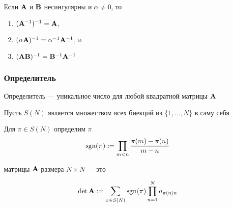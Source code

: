 \begin{frame}

    \vspace{.7em}
    \Fact{\eqref{ET-fa:bpiv}}
    Если $\mathbf A$ и $\mathbf B$ несингулярны и $\alpha \not= 0$, то
    \begin{enumerate}
        \item $(\mathbf A^{-1})^{-1} = \mathbf A$,
        \item $(\alpha \mathbf A)^{-1} = \alpha^{-1} \mathbf A^{-1}$, и 
        \item $(\mathbf A \mathbf B)^{-1} = \mathbf B^{-1} \mathbf A^{-1}$
    \end{enumerate}
    
\end{frame}

\begin{frame}\frametitle{Определитель}

    \vspace{.7em}
    Определитель --- уникальное число для любой квадратной матрицы $\mathbf A$
    
    Пусть $S(N)$ является множеством
    всех биекций из $\{1, \ldots, N\}$ в саму себя
    
    \vspace{.7em}
    Для $\pi \in S(N)$ определим  $\pi$ 
    \begin{equation*}
        \operatorname{sgn}(\pi) := \prod_{m < n} \frac{\pi(m) - \pi(n)}{m - n}
    \end{equation*}
    
    \vspace{1em}
     матрицы $\mathbf A$ размера $N \times N$ --- это
    
    \begin{equation*}
        \det \mathbf A 
        := \sum_{\pi \in S(N)} \operatorname{sgn}(\pi) \prod_{n=1}^N a_{\pi(n) n}
    \end{equation*}
    
\end{frame}

